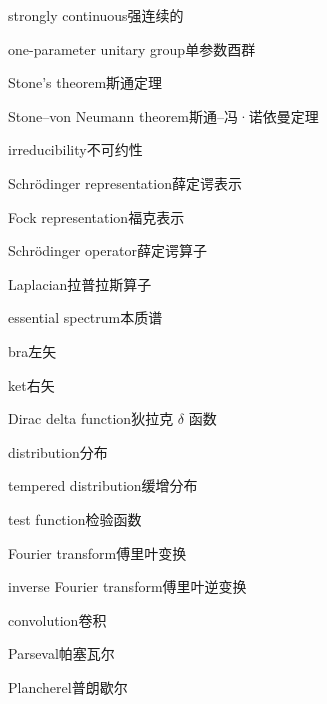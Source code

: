 \begin{multicols}{2}
strongly continuous\hspace{0.9em}强连续的\par
one-parameter unitary group\hspace{0.9em}单参数酉群\par
Stone's theorem\hspace{0.9em}斯通定理\par
Stone–von Neumann theorem\hspace{0.9em}斯通–冯·诺依曼定理\par
irreducibility\hspace{0.9em}不可约性\par
Schrödinger representation\hspace{0.9em}薛定谔表示\par
Fock representation\hspace{0.9em}福克表示\par
Schrödinger operator\hspace{0.9em}薛定谔算子\par
Laplacian\hspace{0.9em}拉普拉斯算子\par
essential spectrum\hspace{0.9em}本质谱\par
bra\hspace{0.9em}左矢\par
ket\hspace{0.9em}右矢\par
Dirac delta function\hspace{0.9em}狄拉克 $\delta$ 函数\par
distribution\hspace{0.9em}分布\par
tempered distribution\hspace{0.9em}缓增分布\par
test function\hspace{0.9em}检验函数\par
Fourier transform\hspace{0.9em}傅里叶变换\par
inverse Fourier transform\hspace{0.9em}傅里叶逆变换\par
convolution\hspace{0.9em}卷积\par
Parseval\hspace{0.9em}帕塞瓦尔\par
Plancherel\hspace{0.9em}普朗歇尔\par
\end{multicols}

